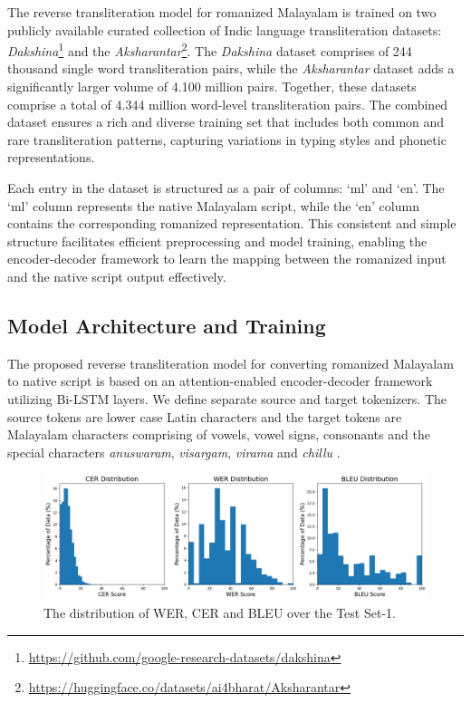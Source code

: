 \documentclass[11pt]{article}
\begin{document}
The reverse transliteration model for romanized Malayalam is trained on two publicly available curated collection of Indic language transliteration datasets: \textit{Dakshina}\footnote{\url{https://github.com/google-research-datasets/dakshina}} and the \textit{Aksharantar}\footnote{\url{https://huggingface.co/datasets/ai4bharat/Aksharantar}}. The \textit{Dakshina} dataset comprises of 244 thousand single word transliteration pairs, while the \textit{Aksharantar} dataset adds a significantly larger volume of 4.100 million pairs. Together, these datasets comprise a total of 4.344 million word-level transliteration pairs. The combined dataset ensures a rich and diverse training set that includes both common and rare transliteration patterns, capturing variations in typing styles and phonetic representations.



Each entry in the dataset is structured as a pair of columns: `ml' and `en'. The `ml' column represents the native Malayalam script, while the `en' column contains the corresponding romanized representation. This consistent and simple structure facilitates efficient preprocessing and model training, enabling the encoder-decoder framework to learn the mapping between the romanized input and the native script output effectively.




\subsection{Model Architecture and Training}
The proposed reverse transliteration model for converting romanized Malayalam to native script is based on an attention-enabled encoder-decoder framework utilizing Bi-LSTM layers. We define separate source and target tokenizers. The source tokens are lower case Latin characters and the target tokens are Malayalam characters comprising of vowels, vowel signs, consonants and the special characters \textit{anuswaram}, \textit{visargam}, \textit{virama} and \textit{chillu} \cite{kavya2022}.


\begin{figure}[!htpb]
  \includegraphics[width=\textwidth]{IndoNLP1_test.png}
  \caption{The distribution of WER, CER and BLEU over the Test Set-1. }
  \label{fig:test1}
\end{figure}
\end{document}
